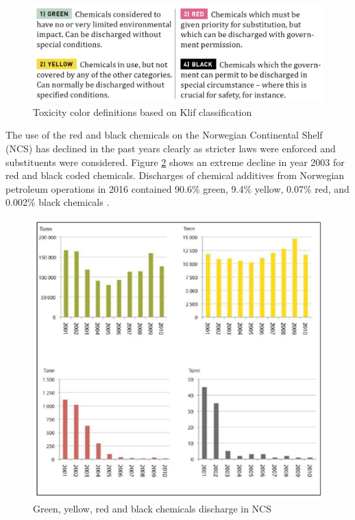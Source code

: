 \begin{figure}
    \centering
    \includegraphics[width=\textwidth]{img/fig/envColors.png}
    \caption{Toxicity color definitions based on Klif classification \citep{Norskolje2018}}
    \label{fig:envColors} %
\end{figure}

The use of the red and black chemicals on the Norwegian Continental Shelf (NCS) has declined in the past years clearly as stricter laws were enforced and substituents were considered. Figure \ref{fig:colorsNcs} shows an extreme decline in year 2003 for red and black coded chemicals. Discharges of chemical additives from Norwegian petroleum operations in 2016 contained 90.6\% green, 9.4\% yellow, 0.07\% red, and 0.002\% black chemicals \citep{Norskolje2018}. 

\begin{figure}
    \centering
    \includegraphics[width=\textwidth]{img/fig/colorsNcs.png}
    \caption{Green, yellow, red and black chemicals discharge in NCS  \citep{Norskolje2018}}
    \label{fig:colorsNcs} %
\end{figure}

